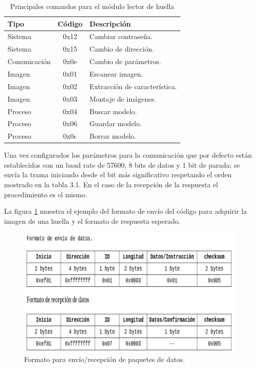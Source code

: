 \begin{table}[h]
	\centering
	\caption[Comandos módulo lector de huellas]{Principales comandos para el módulo lector de huella}
	\begin{tabular}{l c l}    
		\toprule
		\textbf{Tipo}  & \textbf{Código}  & \textbf{Descripción}\\
		\midrule
		Sistema	 	& 0x12 	& Cambiar contraseña.\\		
		Sistema	 	& 0x15 	& Cambio de dirección.\\
		Comunicación & 0x0e & Cambio de parámetros.\\	
		Imagen	 	& 0x01 	& Escanear imagen.\\
		Imagen	 	& 0x02 	& Extracción de característica.\\
		Imagen	 	& 0x03 	& Montaje de imágenes.\\
		Proceso	 	& 0x04 	& Buscar modelo.\\
		Proceso	 	& 0x06 	& Guardar modelo.\\				
		Proceso	 	& 0x0c 	& Borrar  modelo.\\				
		\bottomrule
		\hline
	\end{tabular}
	\label{tab:comandos}
\end{table}

Una vez configurados los parámetros para la comunicación que por defecto están establecidos con un baud rate de 57600, 8 bits de datos y 1 bit de parada; se envía la trama iniciando desde el bit más significativo respetando el orden mostrado en la tabla 3.1.
En el caso de la recepción de la respuesta el procedimiento es el mismo.

La figura \ref{fig:tablasensor} muestra el ejemplo del formato de envío del código para adquirir la imagen de una huella y el formato de respuesta esperado.

\begin{figure}[h]
	\centering
	\includegraphics[scale=.3]{./Figures/tablasensor.png}
	\caption{Formato para envío/recepción de paquetes de datos.}
	\label{fig:tablasensor}
\end{figure}

